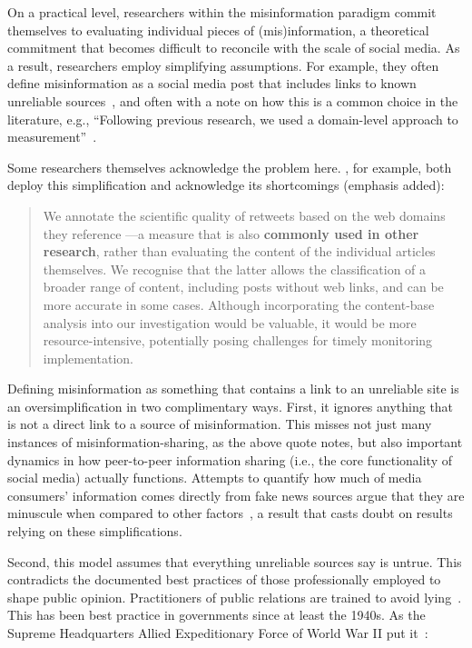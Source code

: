 \documentclass[          
 pre,
 twocolumn,
 twoside,
 superscriptaddress,
 amsmath,
 amssymb,                
 apsf
]{revtex4-2}
\begin{document}
On a practical level, researchers within the misinformation paradigm commit themselves to evaluating individual pieces of (mis)information, a theoretical commitment that becomes difficult to reconcile with the scale of social media. As a result, researchers employ simplifying assumptions. For example, they often define misinformation as a social media post that includes links to known unreliable sources~\cite{flaminoPoliticalPolarizationNews2023, bovetInfluenceFakeNews2019, hanMeasuringCoevolutionOnline2025, guessExposureUntrustworthyWebsites2020}, and often with a note on how this is a common choice in the literature, e.g., ``Following
previous research, we used a domain-level approach to measurement''~\cite{guessExposureUntrustworthyWebsites2020}. 

Some researchers themselves acknowledge the problem here. \citet{hanMeasuringCoevolutionOnline2025}, for example, both deploy this simplification and acknowledge its shortcomings (emphasis added):

\begin{quote}
    We annotate the scientific quality of retweets based on the web domains they reference —a measure that is also \textbf{commonly used in other research}, rather than evaluating the content of the individual articles themselves. We recognise that the latter allows the classification of a broader range of content, including posts without web links, and can be more accurate in some cases. Although incorporating the content-base analysis into our investigation would be valuable, it would be more resource-intensive, potentially posing challenges for timely monitoring implementation.

\end{quote}

Defining misinformation as something that contains a link to an unreliable site is an oversimplification in two complimentary ways. First, it ignores anything that is not a direct link to a source of misinformation. This misses not just many instances of misinformation-sharing, as the above quote notes, but also important dynamics in how peer-to-peer information sharing (i.e., the core functionality of social media) actually functions. Attempts to quantify how much of media consumers' information comes directly from fake news sources argue that they are minuscule when compared to other factors~\cite{Allen2020FakeNews}, a result that casts doubt on results relying on these simplifications.

Second, this model assumes that everything unreliable sources say is untrue. This contradicts the documented best practices of those professionally employed to shape public opinion. Practitioners of public relations are trained to avoid lying~\cite{tremblay_pepin_intrigues_2025}. This has been best practice in governments since at least the 1940s. As the Supreme Headquarters Allied Expeditionary Force of World War II put it~\cite{ellul1973propaganda}:
\end{document}
